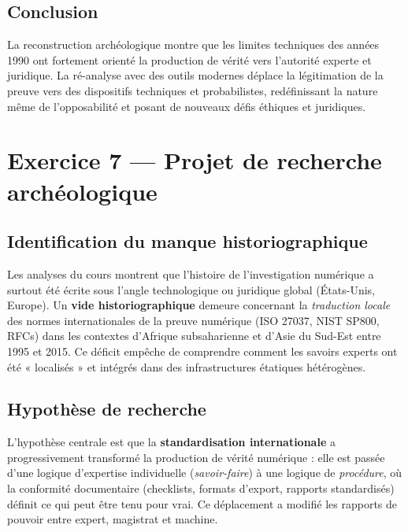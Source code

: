 \documentclass[memoire, 12pt]{report}
\begin{document}
\subsection*{Conclusion}
La reconstruction archéologique montre que les limites techniques des années 1990 ont fortement orienté la production de vérité vers l'autorité experte et juridique. La ré-analyse avec des outils modernes déplace la légitimation de la preuve vers des dispositifs techniques et probabilistes, redéfinissant la nature même de l'opposabilité et posant de nouveaux défis éthiques et juridiques.

\bigskip


\section{Exercice 7 — Projet de recherche archéologique}

\subsection*{Identification du manque historiographique}
Les analyses du cours montrent que l’histoire de l’investigation numérique a surtout été écrite sous l’angle technologique ou juridique global (États-Unis, Europe).  
Un \textbf{vide historiographique} demeure concernant la \textit{traduction locale} des normes internationales de la preuve numérique (ISO 27037, NIST SP800, RFCs) dans les contextes d’Afrique subsaharienne et d’Asie du Sud-Est entre 1995 et 2015.  
Ce déficit empêche de comprendre comment les savoirs experts ont été « localisés » et intégrés dans des infrastructures étatiques hétérogènes.

\subsection*{Hypothèse de recherche}
L’hypothèse centrale est que la \textbf{standardisation internationale} a progressivement transformé la production de vérité numérique :  
elle est passée d’une logique d’expertise individuelle (\textit{savoir-faire}) à une logique de \textit{procédure}, où la conformité documentaire (checklists, formats d’export, rapports standardisés) définit ce qui peut être tenu pour vrai.  
Ce déplacement a modifié les rapports de pouvoir entre expert, magistrat et machine.
\end{document}
